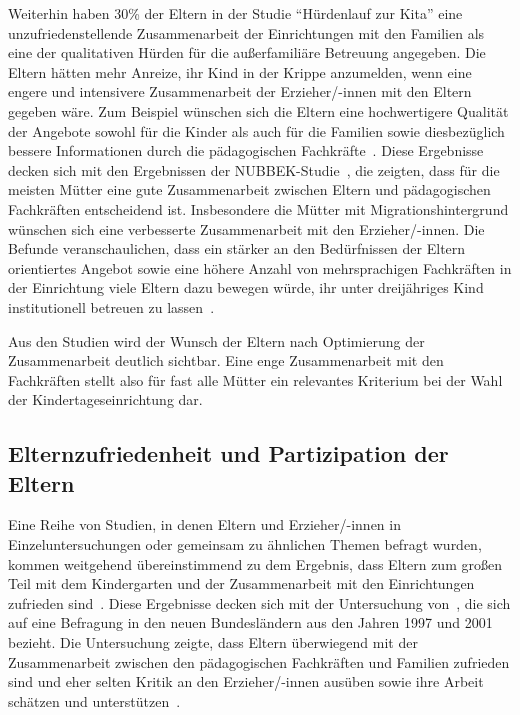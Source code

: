 \documentclass[12pt,a4paper]{article}
\begin{document}
Weiterhin haben 30\% der Eltern in der Studie "`Hürdenlauf zur Kita"' eine unzufriedenstellende Zusammenarbeit der Einrichtungen mit den Familien als eine der qualitativen Hürden für die außerfamiliäre Betreuung angegeben. Die Eltern hätten mehr Anreize, ihr Kind in der Krippe anzumelden, wenn eine engere und intensivere Zusammenarbeit der Erzieher/-innen mit den Eltern gegeben wäre. Zum Beispiel wünschen sich die Eltern eine hochwertigere Qualität der Angebote sowohl für die Kinder als auch für die Familien sowie diesbezüglich bessere Informationen durch die pädagogischen Fachkräfte~\parencite[S.~16]{SVR}. Diese Ergebnisse decken sich mit den Ergebnissen der NUBBEK-Studie~\parencite{NUBBEK}, die zeigten, dass für die meisten Mütter eine gute Zusammenarbeit zwischen Eltern und pädagogischen Fachkräften entscheidend ist. Insbesondere die Mütter mit Migrationshintergrund wünschen sich eine verbesserte Zusammenarbeit mit den Erzieher/-innen. Die Befunde veranschaulichen, dass ein stärker an den Bedürfnissen der Eltern orientiertes Angebot sowie eine höhere Anzahl von mehrsprachigen Fachkräften in der Einrichtung viele Eltern dazu bewegen würde, ihr unter dreijähriges Kind institutionell betreuen zu lassen~\parencite[S.~61-67]{Bensel_2013}.

Aus den Studien wird der Wunsch der Eltern nach Optimierung der Zusammenarbeit deutlich sichtbar. Eine enge Zusammenarbeit mit den Fachkräften stellt also für fast alle Mütter ein relevantes Kriterium bei der Wahl der Kindertageseinrichtung dar.


\subsection{Elternzufriedenheit und Partizipation der Eltern}
\label{fragestellungen}
Eine Reihe von Studien, in denen Eltern und Erzieher/-innen in Einzeluntersuchungen oder gemeinsam zu ähnlichen Themen befragt wurden, kommen weitgehend übereinstimmend zu dem Ergebnis, dass Eltern zum großen Teil mit dem Kindergarten und der Zusammenarbeit mit den Einrichtungen zufrieden sind~\parencite{Dippelhofer_1995, Textor_1992}. Diese Ergebnisse decken sich mit der Untersuchung von~\textcite{Wolf_2002}, die sich auf eine Befragung in den neuen Bundesländern aus den Jahren 1997 und 2001 bezieht. Die Untersuchung zeigte, dass Eltern überwiegend mit der Zusammenarbeit zwischen den pädagogischen Fachkräften und Familien zufrieden sind und eher selten Kritik an den Erzieher/-innen ausüben sowie ihre Arbeit schätzen und unterstützen~\parencite[S.~32-34]{Wolf_2002}.
\end{document}
